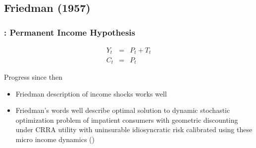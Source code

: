 \subsection{Friedman (1957)}
\begin{frame}
\frametitle{{\citet{friedmanAtheory}: Permanent Income Hypothesis}}
\begin{eqnarray*}
Y_{t}&=&P_{t}+T_{t}\\
C_{t}&=&P_{t}
\end{eqnarray*}

\begin{block}{Progress since then}
\begin{itemize}
  \item {} Friedman description of income shocks works well
  \item {} Friedman's words well describe optimal solution to dynamic stochastic optimization problem of impatient consumers with geometric discounting under CRRA utility with uninsurable idiosyncratic risk calibrated using these micro income dynamics (\jemph{!})
\end{itemize}
\end{block}

\end{frame}

\begin{comment} %
\subsection{Modifications to the Benchmark KS model}
\begin{frame}
\frametitle{{Use the Benchmark KS model with Modifications}}



\begin{block}{Modifications to \citet{ksHetero}}
  \begin{enumerate}
    \item Serious \jemph{income process}
        \begin{itemize}
        \item MaCurdy, Card, Abowd; Blundell, Low, Meghir, Pistaferri, \dots
        \end{itemize}
    \item \jemph{Finite lifetimes} (i.e., introduce \citet{blanchard:finite} death, $\PDies$)
    \item Heterogeneity in \jemph{time preference factors}
  \end{enumerate}
\end{block}

\end{frame}

\end{comment}

